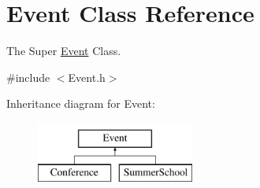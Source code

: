 \hypertarget{classEvent}{}\section{Event Class Reference}
\label{classEvent}


The Super \mbox{\hyperlink{classEvent}{Event}} Class.  




{\ttfamily \#include $<$Event.\+h$>$}

Inheritance diagram for Event\+:\begin{figure}[H]
\begin{center}
\leavevmode
\includegraphics[height=2.000000cm]{classEvent}
\end{center}
\end{figure}
